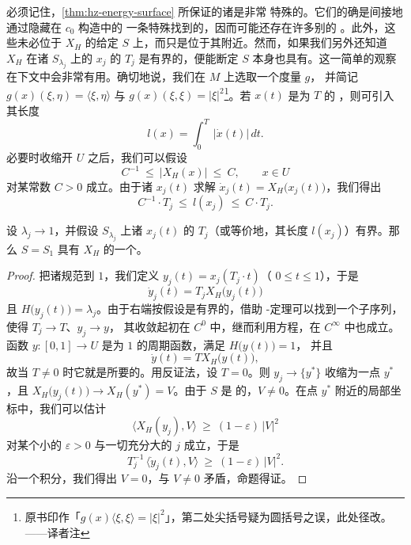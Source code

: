 必须记住，\cref{thm:hz-energy-surface} 所保证的诸\trPeriodicSolution{}是非常%
特殊的。它们的确是间接地通过隐藏在\trSymplecticInvariant{} $c_{0}$ 构造中的%
一条特殊\trVariationalPrinciple{}找到的，因而可能还存在许多别的%
\trPeriodicSolution。此外，这些\trPeriodicSolution{}未必位于 $X_{H}$ 的给定%
\trEnergySurface{} $S$ 上，而只是位于其附近。然而，如果我们另外还知道%
$X_{H}$ 在诸 $S_{\lambda_{j}}$ 上的\trPeriodicSolution{} $x_{j}$ 的\trPeriodic{}%
$T_{j}$ 是有界的，便能断定 $S$ 本身也具有\trPeriodicSolution。这一简单的观察%
在下文中会非常有用。确切地说，我们在 $M$ 上选取一个\trRiemann{}度量 $g$，%
并简记 $g(x)(\xi,\eta)=\langle\xi,\eta\rangle$ 与%
$g(x)(\xi,\xi)=\lvert\xi\rvert^{2}$\footnote{原书印作「$g(x)\langle\xi,\xi\rangle=|\xi|^{2}$」，第二处尖括号疑为圆括号之误，此处径改。——译者注}。若 $x(t)$ 是\trPeriodic{}为 $T$ 的%
\trPeriodicSolution，则可引入其长度
\[
l(x)=\int_{0}^{T}\ \lvert\dot{x}(t)\rvert\,dt.
\]
必要时收缩开\trNeighborhood{} $U$ 之后，我们可以假设
\[
C^{-1}\ \leq\ \lvert X_{H}(x)\rvert\ \leq\ C,\qquad x\in U
\]
对某常数 $C>0$ 成立。由于诸 $x_{j}(t)$ 求解\trHamiltonianEquation{}%
$\dot{x}_{j}(t)=X_{H}\bigl(x_{j}(t)\bigr)$，我们得出
\[
C^{-1}\cdot T_{j}\ \leq\ l(x_{j})\ \leq\ C\cdot T_{j}.
\]

\begin{proposition}\label{prop:bounded-periods-limit}
设 $\lambda_{j}\to1$，并假设 $S_{\lambda_{j}}$ 上诸\trPeriodicSolution{}%
$x_{j}(t)$ 的\trPeriodic{} $T_{j}$（或等价地，其长度 $l(x_{j})$）有界。那么%
$S=S_{1}$ 具有 $X_{H}$ 的一个\trPeriodicSolution。
\end{proposition}
\begin{proof}
把诸\trPeriodic{}规范到 $1$，我们定义 $y_{j}(t)=x_{j}(T_{j}\cdot t)$（%
$0\leq t\leq1$），于是
\[
\dot{y}_{j}(t)=T_{j}X_{H}\bigl(y_{j}(t)\bigr)
\]
且 $H\bigl(y_{j}(t)\bigr)=\lambda_{j}$。由于右端按假设是有界的，借助%
\trArzela-\trAscoli{}定理可以找到一个子序列，使得 $T_{j}\to T$、$y_{j}\to y$，%
其收敛起初在 $C^{0}$ 中，继而利用方程，在 $C^{\infty}$ 中也成立。函数%
$y:[0,1]\to U$ 是\trPeriodic{}为 $1$ 的周期函数，满足 $H\bigl(y(t)\bigr)=1$，%
并且
\[
\dot{y}(t)=TX_{H}\bigl(y(t)\bigr),
\]
故当 $T\neq0$ 时它就是所要的\trPeriodicSolution。用反证法，设 $T=0$。则%
$y_{j}\to\{y^{*}\}$ 收缩为一点 $y^{*}$，且%
$X_{H}\bigl(y_{j}(t)\bigr)\to X_{H}(y^{*})=V$。由于\trEnergySurface{} $S$ 是%
\trRegular{}的，$V\neq0$。在点 $y^{*}$ 附近的局部坐标中，我们可以估计
\[
\bigl\langle X_{H}(y_{j}),V\bigr\rangle\ \geq\ (1-\varepsilon)\,\lvert V\rvert^{2}
\]
对某个小的 $\varepsilon>0$ 与一切充分大的 $j$ 成立，于是
\[
T_{j}^{-1}\,\bigl\langle\dot{y}_{j}(t),V\bigr\rangle\ \geq\ (1-\varepsilon)\,%
\lvert V\rvert^{2}.
\]
沿一个\trPeriodic{}积分，我们得出 $V=0$，与 $V\neq0$ 矛盾，命题得证。
\end{proof}

